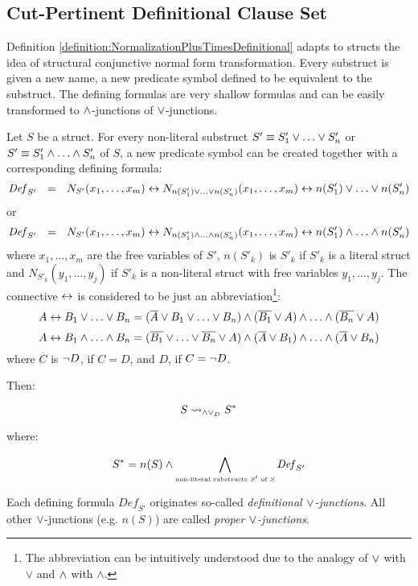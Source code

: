\documentclass{llncs}
\begin{document}
\subsection{Cut-Pertinent Definitional Clause Set}

Definition \ref{definition:NormalizationPlusTimesDefinitional} adapts to structs the idea of structural conjunctive normal form transformation. Every substruct is given a new name, a new predicate symbol defined to be equivalent to the substruct. The defining formulas are very shallow formulas and can be easily transformed to $\wedge$-junctions of $\vee$-junctions. 


\newcommand{\normalizePlusTimesD}{\leadsto_{\structplus\structtimes_{D}}}
\begin{definition}[$\normalizePlusTimesD$]
\label{definition:NormalizationPlusTimesDefinitional}

Let $S$ be a struct. For every non-literal substruct $S' \equiv S'_1 \vee \ldots \vee S'_n$ or $S' \equiv S'_1 \wedge \ldots \wedge S'_n$ of $S$, a new predicate symbol can be created together with a corresponding defining formula:
%
$$
\mathit{Def}_{S'} \ \ \defEq \ \  N_{S'}(x_1,\ldots, x_m) \biimp N_{n(S'_1) \structtimes \ldots \structtimes n(S'_n)}(x_1,\ldots, x_m) \biimp n(S'_1) \structtimes \ldots \structtimes n(S'_n)
$$
%
or 
%
$$
\mathit{Def}_{S'} \ \ \defEq \ \ N_{S'}(x_1,\ldots, x_m) \biimp N_{n(S'_1) \structplus \ldots \structplus n(S'_n)}(x_1,\ldots, x_m) \biimp n(S'_1) \structplus \ldots \structplus n(S'_n)
$$
%
where $x_1,\ldots, x_m$ are the free variables of $S'$, $n(S'_k)$ is $S'_k$ if $S'_k$ is a literal struct and $N_{S'_k}(y_1,\ldots, y_j)$ if $S'_k$ is a non-literal struct with free variables $y_1,\ldots, y_j$. The connective $\leftrightarrow$ is considered to be just an abbreviation\footnote{The abbreviation can be intuitively understood due to the analogy of $\vee$ with $\vee$ and $\wedge$ with $\wedge$.}:
$$
A \leftrightarrow B_1 \vee \ldots \vee B_n = 
(\overline{A} \vee B_1 \vee \ldots \vee B_n) \wedge 
(\overline{B_1} \vee A) \wedge \ldots \wedge 
(\overline{B_n} \vee A)
$$
$$
A \leftrightarrow B_1 \wedge \ldots \wedge B_n = 
(\overline{B_1} \vee \ldots \vee \overline{B_n} \vee A ) \wedge 
(\overline{A} \vee B_1) \wedge \ldots \wedge 
(\overline{A} \vee B_n)
$$
where $\overline{C}$ is $\neg D$, if $C = D$, and $D$, if $C = \neg D$.

Then:

$$
S \normalizePlusTimesD S^*
$$

where:

$$
S^* = n(S) \wedge \bigwedge_{\scriptscriptstyle \textrm{non-literal substructs } S'\textrm{ of }S } \mathit{Def}_{S'}
$$

Each defining formula $\mathit{Def}_{S'}$ originates so-called \emph{definitional $\vee$-junctions}. All other $\vee$-junctions (e.g. $n(S)$) are called \emph{proper $\vee$-junctions}.
\end{definition}
\end{document}
